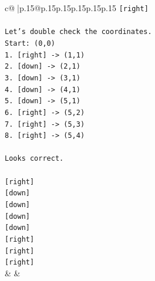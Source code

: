 \documentclass{article}
\begin{document}
{\begin{supertabular}{c@{$\;$}|p{.15\linewidth}@{}p{.15\linewidth}p{.15\linewidth}p{.15\linewidth}p{.15\linewidth}p{.15\linewidth}}
{{{\texttt{{[}right{]}} \\
\\ 
\texttt{Let's double check the coordinates.} \\
\texttt{Start: (0,0)} \\
\texttt{1. {[}right{]} {-}> (1,1)} \\
\texttt{2. {[}down{]} {-}> (2,1)} \\
\texttt{3. {[}down{]} {-}> (3,1)} \\
\texttt{4. {[}down{]} {-}> (4,1)} \\
\texttt{5. {[}down{]} {-}> (5,1)} \\
\texttt{6. {[}right{]} {-}> (5,2)} \\
\texttt{7. {[}right{]} {-}> (5,3)} \\
\texttt{8. {[}right{]} {-}> (5,4)} \\
\\ 
\texttt{Looks correct.} \\
\\ 
\texttt{{[}right{]}} \\
\texttt{{[}down{]}} \\
\texttt{{[}down{]}} \\
\texttt{{[}down{]}} \\
\texttt{{[}down{]}} \\
\texttt{{[}right{]}} \\
\texttt{{[}right{]}} \\
\texttt{{[}right{]}} \\
            }
        }
    }
    & & \\ \\


\end{supertabular}}
\end{document}
